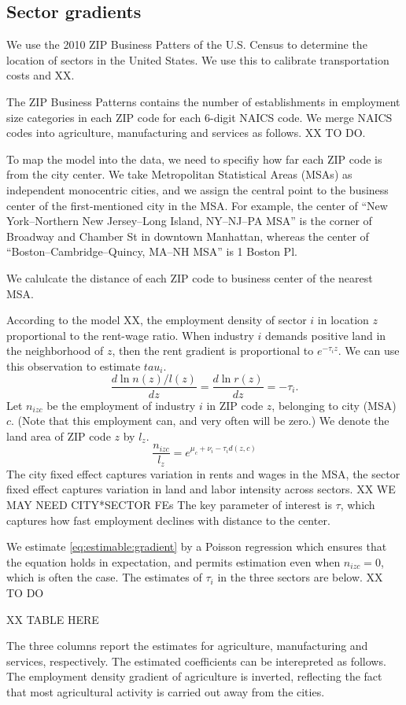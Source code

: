 \documentclass[12pt]{article}
\begin{document}
\subsection{Sector gradients}
We use the 2010 ZIP Business Patters of the U.S. Census to determine the location of sectors in the United States. We use this to calibrate transportation costs and XX.

The ZIP Business Patterns contains the number of establishments in employment size categories in each ZIP code for each 6-digit NAICS code. We merge NAICS codes into agriculture, manufacturing and services as follows. XX TO DO.

To map the model into the data, we need to specifiy how far each ZIP code is from the city center. We take Metropolitan Statistical Areas (MSAs) as independent monocentric cities, and we assign the central point to the business center of the first-mentioned city in the MSA. For example, the center of ``New York–Northern New Jersey–Long Island, NY–NJ–PA MSA'' is the corner of Broadway and Chamber St in downtown Manhattan, whereas the center of ``Boston–Cambridge–Quincy, MA–NH MSA'' is 1 Boston Pl.

We calulcate the distance of each ZIP code to business center of the nearest MSA. 

According to the model XX, the employment density of sector $i$ in location $z$ proportional to the rent-wage ratio. When industry $i$ demands positive land in the neighborhood of $z$, then the rent gradient is proportional to $e^{-\tau_iz}$. We can use this observation to estimate $tau_i$.
\[
\frac{d\ln n(z)/l(z)}{dz} =\frac{d\ln r(z)}{dz} = -\tau_i.
\]
Let $n_{izc}$ be the employment of industry $i$ in ZIP code $z$, belonging to city (MSA) $c$. (Note that this employment can, and very often will be zero.) We denote the land area of ZIP code $z$ by $l_z$.
\begin{equation}\label{eq:estimable:gradient}
\frac{n_{izc}}{l_z} = e^{\mu_c+\nu_i-\tau_i d(z,c)}
\end{equation}
The city fixed effect captures variation in rents and wages in the MSA, the sector fixed effect captures variation in land and labor intensity across sectors. XX WE MAY NEED CITY*SECTOR FEs The key parameter of interest is $\tau$, which captures how fast employment declines with distance to the center.

We estimate \eqref{eq:estimable:gradient} by a Poisson regression which ensures that the equation holds in expectation, and permits estimation even when $n_{izc}=0$, which is often the case. The estimates of $\tau_i$ in the three sectors are below. XX TO DO

XX TABLE HERE

The three columns report the estimates for agriculture, manufacturing and services, respectively. The estimated coefficients can be interepreted as follows. The employment density gradient of agriculture is inverted, reflecting the fact that most agricultural activity is carried out away from the cities.
\end{document}
